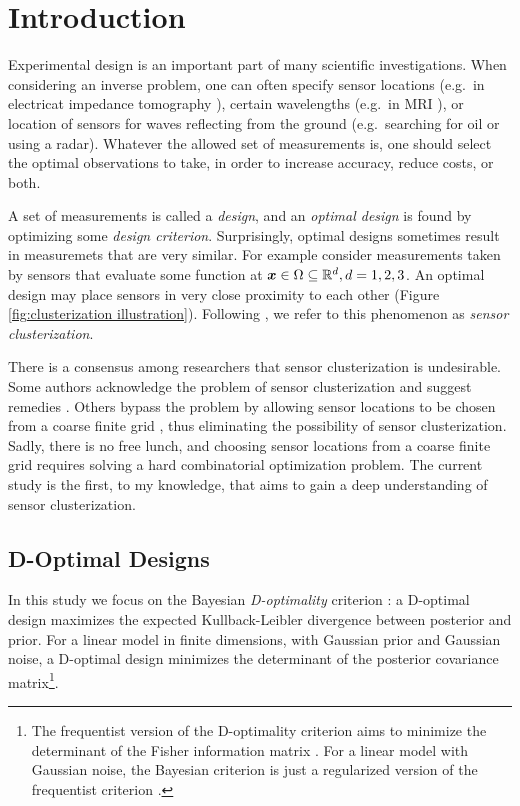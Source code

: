 \section{Introduction}\label{section:OED intro}
Experimental design is an important part of many scientific
investigations. When considering an inverse problem, one can often
specify sensor locations (e.g.\ in electricat impedance tomography
\cite{horesh2010impedance}), certain wavelengths (e.g.\ in MRI
\cite{horesh2008mri}), or location of sensors for waves reflecting
from the ground (e.g.\ searching for oil \cite{horesh2008borehole} or
using a radar). Whatever the allowed set of measurements is, one
should select the optimal observations to take, in order to increase
accuracy, reduce costs, or both.

A set of measurements is called a \emph{design}, and an \emph{optimal
design} is found by optimizing some \emph{design
criterion}. Surprisingly, optimal designs sometimes result in
measuremets that are very similar. For example consider measurements
taken by sensors that evaluate some function at ${\boldsymbol{x}} \in \Omega
\subseteq \mathbb{R}^d, d=1,2,3$. An optimal design may place sensors in very
close proximity to each other (Figure \ref{fig:clusterization
  illustration}). Following \cite{Ucinski05}, we refer to this
phenomenon as \emph{sensor clusterization}.

There is a consensus among researchers that sensor clusterization is
undesirable. Some authors acknowledge the problem of sensor
clusterization and suggest remedies \cite{fedorov1996, hooker2009,
  fedorov2012, Ucinski05, neitzel2019sparse}. Others bypass the
problem by allowing sensor locations to be chosen from a coarse finite
grid \cite{alexanderian2014sparsification,
  AlexanderianPetraStadlerEtAl16, alexanderian2018efficient,
  koval2020, attia2020}, thus eliminating the possibility of sensor
clusterization. Sadly, there is no free lunch, and choosing sensor
locations from a coarse finite grid requires solving a hard
combinatorial optimization problem. The current study is the first, to
my knowledge, that aims to gain a deep understanding of sensor
clusterization.


\subsection{D-Optimal Designs}
In this study we focus on the Bayesian \emph{D-optimality} criterion
\cite{Chaloner1995}: a D-optimal design maximizes the expected
Kullback-Leibler divergence \cite{CoverThomas91} between posterior and
prior. For a linear model in finite dimensions, with Gaussian prior
and Gaussian noise, a D-optimal design minimizes the determinant of
the posterior covariance matrix\footnote{The frequentist version of
the D-optimality criterion aims to minimize the determinant of the
Fisher information matrix \cite[page 16]{Ucinski05}. For a linear
model with Gaussian noise, the Bayesian criterion is just
a regularized version of the frequentist criterion
\cite{Chaloner1995}.}.

